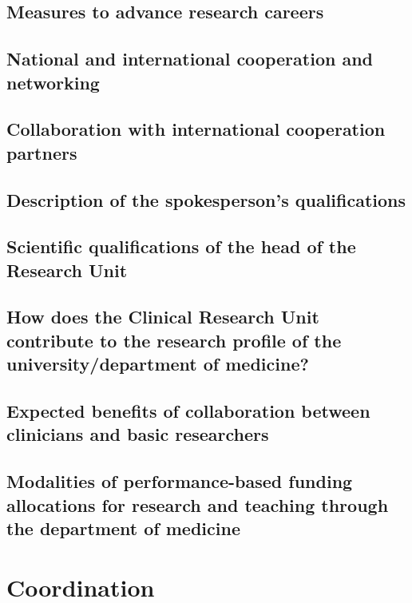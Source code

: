 \documentclass{scrartcl}
\begin{document}
\subsection{Measures to advance research careers}

\subsection{National and international cooperation and networking}

\subsection{Collaboration with international cooperation partners}

\subsection{Description of the spokesperson's qualifications }

\subsection{Scientific qualifications of the head of the Research Unit}

\subsection{How does the Clinical Research Unit contribute to the research profile of the university/department of medicine? }

\subsection{Expected benefits of collaboration between clinicians and basic researchers }

\subsection{Modalities of performance-based funding allocations for research and teaching through the department of medicine}


\section{Coordination}
\end{document}
